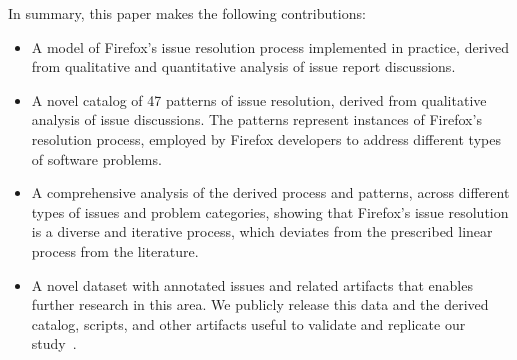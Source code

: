 In summary, this paper makes the following contributions:
\begin{itemize}
    \item A model of Firefox's issue resolution process implemented in practice, derived from qualitative and quantitative analysis of issue report discussions. 
    \item A novel catalog of 47 patterns of issue resolution, derived from qualitative analysis of issue discussions. The patterns represent instances of Firefox's resolution process, employed by Firefox developers to address different types of software problems.
    \item A comprehensive analysis of the derived process and patterns, across different types of issues and problem categories, showing that Firefox's issue resolution is a diverse and iterative process, which deviates from the prescribed linear process from the literature.
    \item A novel dataset with annotated issues and related artifacts that enables further research in this area. We publicly release this data and the derived catalog, scripts, and other artifacts useful to validate and replicate our study~\cite{repl_pack}.
\end{itemize}








